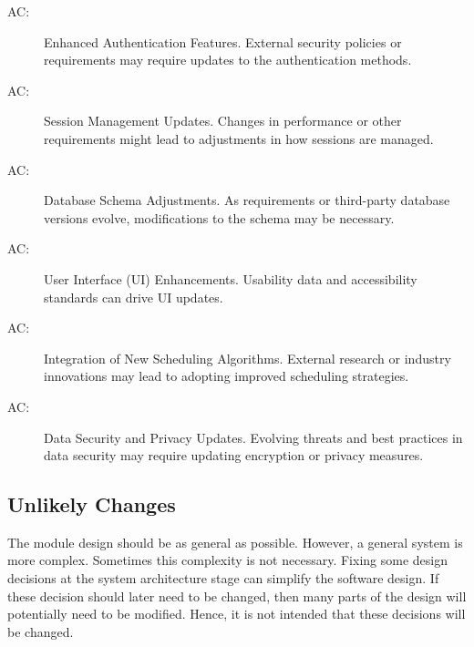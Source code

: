 \documentclass[12pt, titlepage]{article}
\newcounter{acnum}
\newcommand{\actheacnum}{AC\theacnum}
\begin{document}
\begin{description}
  \item[ \actheacnum \label{acEnhancedAuth}:] Enhanced Authentication Features.
        External security policies or requirements may require updates to the authentication methods.
  \item[ \actheacnum \label{acSessionUpdate}:] Session Management Updates.
        Changes in performance or other requirements might lead to adjustments in how sessions are managed.
  \item[ \actheacnum \label{acDbSchema}:] Database Schema Adjustments.
        As requirements or third-party database versions evolve, modifications to the schema may be necessary.
  \item[ \actheacnum \label{acUIEnhance}:] User Interface (UI) Enhancements.
        Usability data and accessibility standards can drive UI updates.
  \item[ \actheacnum \label{acNewAlg}:] Integration of New Scheduling Algorithms.
        External research or industry innovations may lead to adopting improved scheduling strategies.
  \item[ \actheacnum \label{acDataSecurity}:] Data Security and Privacy Updates.
        Evolving threats and best practices in data security may require updating encryption or privacy measures.
\end{description}

\subsection{Unlikely Changes} \label{SecUchange}

The module design should be as general as possible. However, a general system is
more complex. Sometimes this complexity is not necessary. Fixing some design
decisions at the system architecture stage can simplify the software design. If
these decision should later need to be changed, then many parts of the design
will potentially need to be modified. Hence, it is not intended that these
decisions will be changed.
\end{document}
